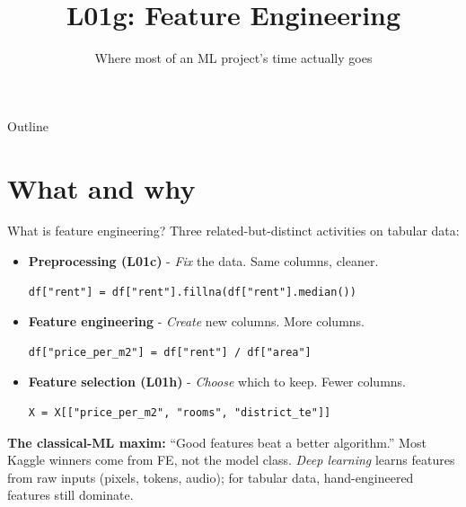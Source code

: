 \documentclass[aspectratio=169]{beamer}
\title{L01g: Feature Engineering}
\subtitle{Where most of an ML project's time actually goes}
\date{}
\begin{document}
\begin{frame}{Outline}
  \tableofcontents
\end{frame}

\section{What and why}

\begin{frame}[fragile]{What is feature engineering?}
  Three related-but-distinct activities on tabular data:
  \vfill
  \begin{itemize}\footnotesize
    \item \textbf{Preprocessing (L01c)} - \emph{Fix} the data. Same columns, cleaner. \\
{\lstset{basicstyle=\ttfamily\scriptsize}\begin{lstlisting}
df["rent"] = df["rent"].fillna(df["rent"].median())
\end{lstlisting}}
    \item \textbf{Feature engineering} - \emph{Create} new columns. More columns. \\
{\lstset{basicstyle=\ttfamily\scriptsize}\begin{lstlisting}
df["price_per_m2"] = df["rent"] / df["area"]
\end{lstlisting}}
    \item \textbf{Feature selection (L01h)} - \emph{Choose} which to keep. Fewer columns. \\
{\lstset{basicstyle=\ttfamily\scriptsize}\begin{lstlisting}
X = X[["price_per_m2", "rooms", "district_te"]]
\end{lstlisting}}
  \end{itemize}
  \vfill
  \footnotesize \textbf{The classical-ML maxim:} ``Good features beat a better algorithm.'' Most Kaggle winners come from FE, not the model class. \emph{Deep learning} learns features from raw inputs (pixels, tokens, audio); for tabular data, hand-engineered features still dominate.
\end{frame}
\end{document}
